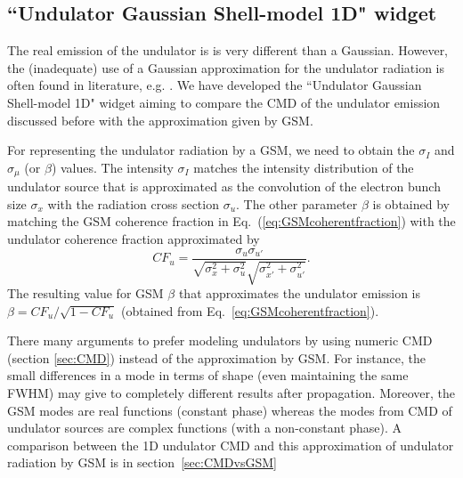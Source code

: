\documentclass{iopconfser}
\newcommand{\todo}[1]{{\color{red}[TODO: "#1'']}}
\begin{document}
\subsection{``Undulator Gaussian Shell-model 1D" widget}
\label{sec:undulatorGSM}

The real emission of the undulator is is very different than a Gaussian. However, the (inadequate) use of a Gaussian approximation for the undulator radiation is often found in literature, e.g.  \citep{coisson1997}.
We have developed the ``Undulator Gaussian Shell-model 1D" widget
aiming to compare the CMD of the undulator emission discussed before with the approximation given by GSM.

For representing the undulator radiation by a GSM, we need to obtain the $\sigma_I$ and $\sigma_\mu$ (or $\beta$) values. The intensity $\sigma_I$ matches the intensity distribution of the undulator source that is approximated as the convolution of the electron bunch size $\sigma_x$ with the radiation cross section $\sigma_u$. The other parameter $\beta$ is obtained by matching the GSM coherence fraction in Eq.~(\ref{eq:GSMcoherentfraction}) with the undulator coherence fraction approximated by
\begin{equation}\label{eq:CFphasespace}
    CF_u = \frac{\sigma_u\sigma_{u'}}{\sqrt{\sigma_x^2+\sigma_u^2}\sqrt{\sigma_{x'}^2+\sigma_{u'}^2}}.
\end{equation}
The resulting value for GSM $\beta$ that approximates the undulator emission is $\beta=CF_u/\sqrt{1-CF_u}$ (obtained from Eq.~\ref{eq:GSMcoherentfraction}).

There many arguments to prefer modeling undulators by using numeric CMD (section \ref{sec:CMD}) instead of the approximation by GSM. For instance, the small differences in a mode in terms of shape (even maintaining the same FWHM) may give to completely different results after propagation. Moreover, the GSM modes are real functions (constant phase) whereas the modes from CMD of undulator sources are complex functions (with a non-constant phase). A comparison between the 1D undulator CMD and this approximation of  undulator radiation by GSM is in section~\ref{sec:CMDvsGSM}

\end{document}

